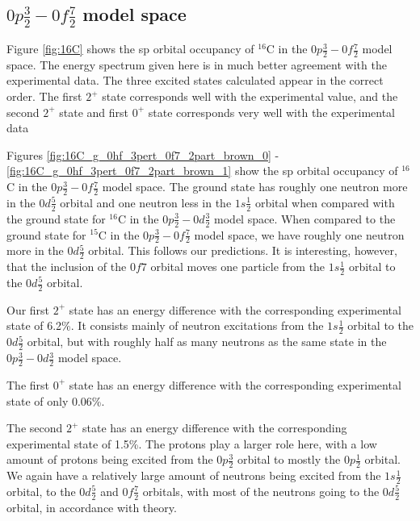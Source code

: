 \subsection{$0p\frac32-0f\frac72$ model space}

Figure \ref{fig:16C} shows the sp orbital occupancy of
$^{16}$C in the $0p\frac32-0f\frac72$ model space. The energy spectrum given
here is in much better agreement with the experimental data. The three excited
states calculated appear in the correct order. The first $2^+$ state
corresponds well with the experimental value, and the second $2^+$ state and
first $0^+$ state corresponds very well with the experimental data

Figures \ref{fig:16C_g_0hf_3pert_0f7_2part_brown_0} -
\ref{fig:16C_g_0hf_3pert_0f7_2part_brown_1} show the sp orbital occupancy of
$^{16}$C in the $0p\frac32-0f\frac72$ model space. The ground state has
roughly one neutron more in the $0d\frac52$ orbital and one neutron less in the
$1s\frac12$ orbital when compared with the ground state for $^{16}$C in the
$0p\frac32-0d\frac32$ model space. When compared to the ground state for
$^{15}$C in the $0p\frac32-0f\frac72$ model space, we have roughly one neutron
more in the $0d\frac52$ orbital. This follows our predictions. It is interesting,
however, that the inclusion of the $0f7$ orbital moves one particle from the
$1s\frac12$ orbital to the $0d\frac52$ orbital.

Our first $2^+$ state has an energy difference with the corresponding
experimental state of 6.2\%. It consists mainly of neutron excitations from the
$1s\frac12$ orbital to the $0d\frac52$ orbital, but with roughly half as many
neutrons as the same state in the $0p\frac32-0d\frac32$ model space.

The first $0^+$ state has an energy difference with the corresponding
experimental state of only 0.06\%.

The second $2^+$ state has an energy difference with the corresponding
experimental state of 1.5\%.  The protons play a larger role here, with a low
amount of protons being excited from the $0p\frac32$ orbital to mostly the
$0p\frac12$ orbital. We again have a relatively large amount of neutrons being
excited from the $1s\frac12$ orbital, to the $0d\frac52$ and $0f\frac72$
orbitals, with most of the neutrons going to the $0d\frac52$ orbital, in
accordance with theory.

